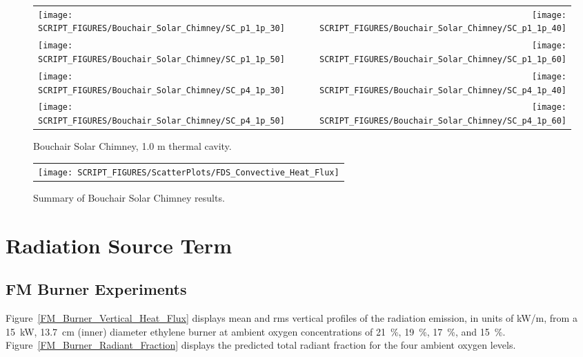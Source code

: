 \begin{figure}[p]
\begin{tabular*}{\textwidth}{l@{\extracolsep{\fill}}r}
\texttt{[image: SCRIPT\_FIGURES/Bouchair\_Solar\_Chimney/SC\_p1\_1p\_30]} &
\texttt{[image: SCRIPT\_FIGURES/Bouchair\_Solar\_Chimney/SC\_p1\_1p\_40]} \\
\texttt{[image: SCRIPT\_FIGURES/Bouchair\_Solar\_Chimney/SC\_p1\_1p\_50]} &
\texttt{[image: SCRIPT\_FIGURES/Bouchair\_Solar\_Chimney/SC\_p1\_1p\_60]} \\
\texttt{[image: SCRIPT\_FIGURES/Bouchair\_Solar\_Chimney/SC\_p4\_1p\_30]} &
\texttt{[image: SCRIPT\_FIGURES/Bouchair\_Solar\_Chimney/SC\_p4\_1p\_40]} \\
\texttt{[image: SCRIPT\_FIGURES/Bouchair\_Solar\_Chimney/SC\_p4\_1p\_50]} &
\texttt{[image: SCRIPT\_FIGURES/Bouchair\_Solar\_Chimney/SC\_p4\_1p\_60]}
\end{tabular*}
\caption[Bouchair Solar Chimney, 1.0 m thermal cavity]{Bouchair Solar Chimney, 1.0 m thermal cavity.}
\label{Bouchair_1p}
\end{figure}

\begin{figure}[h!]
\begin{center}
\begin{tabular}{c}
\texttt{[image: SCRIPT\_FIGURES/ScatterPlots/FDS\_Convective\_Heat\_Flux]}
\end{tabular}
\end{center}
\caption[Summary of Bouchair Solar Chimney results]{Summary of Bouchair Solar Chimney results.}
\label{Mass Flow Rate}
\end{figure}


\clearpage

\section{Radiation Source Term}

\subsection{FM Burner Experiments}
\label{FM_Burner_Heat_Flux_Distribution}

Figure~\ref{FM_Burner_Vertical_Heat_Flux} displays mean and rms vertical profiles of the radiation emission, in units of kW/m, from a 15~kW, 13.7~cm (inner) diameter ethylene burner at ambient oxygen concentrations of 21~\%, 19~\%, 17~\%, and 15~\%. Figure~\ref{FM_Burner_Radiant_Fraction} displays the predicted total radiant fraction for the four ambient oxygen levels.

